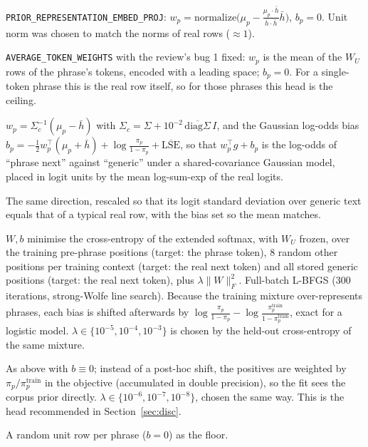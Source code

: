 \documentclass[11pt]{article}
\newcommand{\WU}{W_U}
\renewcommand{\hbar}{\bar{h}}
\newcommand{\lens}[1]{\textsf{#1}}
\begin{document}
\begin{description}[leftmargin=1.6em,itemsep=2pt]
\item[Brennan (\lens{proj}).] \texttt{PRIOR\_REPRESENTATION\_EMBED\_PROJ}: $w_p=\mathrm{normalize}\big(\mu_p-\tfrac{\mu_p\cdot\hbar}{\hbar\cdot\hbar}\hbar\big)$, $b_p=0$. Unit norm was chosen to match the norms of real rows ($\approx 1$).
\item[Average rows (\lens{avgtok}).] \texttt{AVERAGE\_TOKEN\_WEIGHTS} with the review's bug 1 fixed: $w_p$ is the mean of the $\WU$ rows of the phrase's tokens, encoded with a leading space; $b_p=0$. For a single-token phrase this is the real row itself, so for those phrases this head is the ceiling.
\item[LDA (\lens{lda}).] $w_p=\Sigma_c^{-1}(\mu_p-\hbar)$ with $\Sigma_c=\Sigma+10^{-2}\,\overline{\mathrm{diag}\Sigma}\,I$, and the Gaussian log-odds bias $b_p=-\tfrac12 w_p^\top(\mu_p+\hbar)+\log\tfrac{\pi_p}{1-\pi_p}+\overline{\mathrm{LSE}}$, so that $w_p^\top g+b_p$ is the log-odds of ``phrase next'' against ``generic'' under a shared-covariance Gaussian model, placed in logit units by the mean log-sum-exp of the real logits.
\item[LDA, $\WU$-scaled (\lens{lda\_wu}).] The same direction, rescaled so that its logit standard deviation over generic text equals that of a typical real row, with the bias set so the mean matches.
\item[Logistic regression with bias (\lens{lr}).] $W,b$ minimise the cross-entropy of the extended softmax, with $\WU$ frozen, over the training pre-phrase positions (target: the phrase token), 8 random other positions per training context (target: the real next token) and all stored generic positions (target: the real next token), plus $\lambda\|W\|_F^2$. Full-batch L-BFGS (300 iterations, strong-Wolfe line search). Because the training mixture over-represents phrases, each bias is shifted afterwards by $\log\tfrac{\pi_p}{1-\pi_p}-\log\tfrac{\pi^{\mathrm{train}}_p}{1-\pi^{\mathrm{train}}_p}$, exact for a logistic model. $\lambda\in\{10^{-5},10^{-4},10^{-3}\}$ is chosen by the held-out cross-entropy of the same mixture.
\item[Logistic regression without bias (\lens{lr\_nobias}).] As above with $b\equiv 0$; instead of a post-hoc shift, the positives are weighted by $\pi_p/\pi^{\mathrm{train}}_p$ in the objective (accumulated in double precision), so the fit sees the corpus prior directly. $\lambda\in\{10^{-6},10^{-7},10^{-8}\}$, chosen the same way. This is the head recommended in Section~\ref{sec:disc}.
\item[Controls.] A random unit row per phrase ($b=0$) as the floor.
\end{description}
\end{document}
